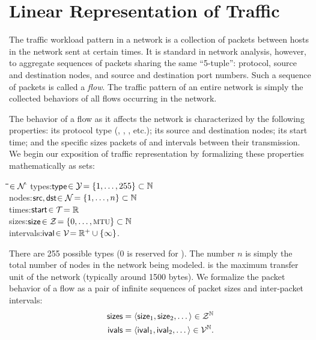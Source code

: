 \documentclass[twocolumn,final]{svjour3}
\begin{document}
\section{Linear Representation of Traffic}
\label{sec:representations}

The traffic workload pattern in a network is a collection of  packets between hosts in the network sent at certain times.
It is standard in network analysis, however, to aggregate sequences of packets sharing the same ``5-tuple'':
 protocol, source and destination nodes, and source and destination  port numbers.
Such a sequence of packets is called a \textit{flow}.
The traffic pattern of an entire network is simply the collected behaviors of all flows occurring in the network.

The behavior of a flow as it affects the network is characterized by the following properties:
its  protocol type (, , , etc.);
its source and destination nodes;
its start time;
and the specific sizes packets of and intervals between their transmission.
We begin our exposition of traffic representation by formalizing these properties mathematically as sets:
\begin{tabbing}
\hspace{1em}\=\bullet\hspace{0.5em}\=\hspace{5em}\=\hspace{4em}\=$\in\mathcal{N}\,$\=\kill
\>\bullet\>types:\>$\text{\textsf{type}}$\>$\in\mathcal{Y}$\>$= {\left\{1,\dots,255\right\}} \subset \mathbb{N}$ \\
\>\bullet\>nodes:\>$\text{\textsf{src}},\text{\textsf{dst}}$\>$\in\mathcal{N}$\>$= {\left\{1,\dots,n\right\}} \subset \mathbb{N}$ \\
\>\bullet\>times:\>$\text{\textsf{start}}$\>$\in\mathcal{T}$\>$= \mathbb{R}$ \\
\>\bullet\>sizes:\>$\text{\textsf{size}}$\>$\in\mathcal{Z}$\>$= \set{0,\dots,\text{\caps{MTU}}} \subset \N$ \\
\>\bullet\>intervals:\>$\text{\textsf{ival}}$\>$\in\mathcal{V}$\>$ = \mathbb{R}^+ \cup {\left\{\infty\right\}}$.
\end{tabbing}
There are 255 possible  types (0 is reserved for ).
The number $n$ is simply the total number of nodes in the network being modeled.
 is the maximum transfer unit of the network (typically around 1500 bytes).
We formalize the packet behavior of a flow as a pair of infinite sequences of packet sizes and inter-packet intervals:
\begin{align}
\text{\textsf{sizes}} &= {\left<\text{\textsf{size}}_1,\text{\textsf{size}}_2,\dots\right>} \in \mathcal{Z}^{\mathbb{N}} \\
\text{\textsf{ivals}} &= {\left<\text{\textsf{ival}}_1,\text{\textsf{ival}}_2,\dots\right>} \in \mathcal{V}^{\mathbb{N}}.
\end{align}
\end{document}
